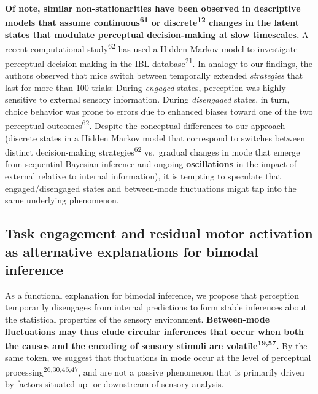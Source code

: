 \documentclass[
]{article}
\begin{document}
\textbf{Of note, similar non-stationarities have been observed in
descriptive models that assume continuous\textsuperscript{61} or
discrete\textsuperscript{12} changes in the latent states that modulate
perceptual decision-making at slow timescales.} A recent computational
study\textsuperscript{62} has used a Hidden Markov model to investigate
perceptual decision-making in the IBL database\textsuperscript{21}. In
analogy to our findings, the authors observed that mice switch between
temporally extended \emph{strategies} that last for more than 100
trials: During \emph{engaged} states, perception was highly sensitive to
external sensory information. During \emph{disengaged} states, in turn,
choice behavior was prone to errors due to enhanced biases toward one of
the two perceptual outcomes\textsuperscript{62}. Despite the conceptual
differences to our approach (discrete states in a Hidden Markov model
that correspond to switches between distinct decision-making
strategies\textsuperscript{62} vs.~gradual changes in mode that emerge
from sequential Bayesian inference and ongoing \textbf{oscillations} in
the impact of external relative to internal information), it is tempting
to speculate that engaged/disengaged states and between-mode
fluctuations might tap into the same underlying phenomenon.

\hypertarget{task-engagement-and-residual-motor-activation-as-alternative-explanations-for-bimodal-inference}{%
\subsection{Task engagement and residual motor activation as alternative
explanations for bimodal
inference}\label{task-engagement-and-residual-motor-activation-as-alternative-explanations-for-bimodal-inference}}

As a functional explanation for bimodal inference, we propose that
perception temporarily disengages from internal predictions to form
stable inferences about the statistical properties of the sensory
environment. \textbf{Between-mode fluctuations may thus elude circular
inferences that occur when both the causes and the encoding of sensory
stimuli are volatile\textsuperscript{19,57}.} By the same token, we
suggest that fluctuations in mode occur at the level of perceptual
processing\textsuperscript{26,30,46,47}, and are not a passive
phenomenon that is primarily driven by factors situated up- or
downstream of sensory analysis.
\end{document}
